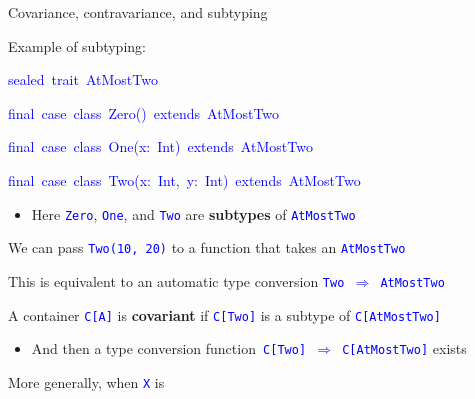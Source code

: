 \documentclass[english]{beamer}
\newenvironment{lyxcode}
   {\par\begin{list}{}{
     \setlength{\rightmargin}{\leftmargin}
     \setlength{\listparindent}{0pt}%
     \raggedright
     \setlength{\itemsep}{0pt}
     \setlength{\parsep}{0pt}
     \normalfont\ttfamily}%
    \def\{{\char`\{}
    \def\}{\char`\}}
    \def\textasciitilde{\char`\~}
    \item[]}
   {\end{list}}
\begin{document}
\begin{frame}{Covariance, contravariance, and subtyping}

\begin{itemize}
\item Example of subtyping:
\begin{lyxcode}
\textcolor{blue}{\footnotesize{}sealed~trait~AtMostTwo}{\footnotesize \par}

\textcolor{blue}{\footnotesize{}final~case~class~Zero()~extends~AtMostTwo}{\footnotesize \par}

\textcolor{blue}{\footnotesize{}final~case~class~One(x:~Int)~extends~AtMostTwo}{\footnotesize \par}

\textcolor{blue}{\footnotesize{}final~case~class~Two(x:~Int,~y:~Int)~extends~AtMostTwo}{\footnotesize \par}
\end{lyxcode}
\begin{itemize}
\item Here \texttt{\textcolor{blue}{\footnotesize{}Zero}}, \texttt{\textcolor{blue}{\footnotesize{}One}},
and \texttt{\textcolor{blue}{\footnotesize{}Two}} are \textbf{subtypes}
of \texttt{\textcolor{blue}{\footnotesize{}AtMostTwo}}{\footnotesize \par}
\end{itemize}
\item We can pass \texttt{\textcolor{blue}{\footnotesize{}Two(10, 20)}}
to a function that takes an \texttt{\textcolor{blue}{\footnotesize{}AtMostTwo}}{\footnotesize \par}
\item This is equivalent to an automatic type conversion \texttt{\textcolor{blue}{\footnotesize{}Two
$\Rightarrow$ AtMostTwo}}{\footnotesize \par}
\item A container \texttt{\textcolor{blue}{\footnotesize{}C{[}A{]}}} is
\textbf{covariant} if \texttt{\textcolor{blue}{\footnotesize{}C{[}Two{]}}}
is a subtype of \texttt{\textcolor{blue}{\footnotesize{}C{[}AtMostTwo{]}}}{\footnotesize \par}
\begin{itemize}
\item And then a type conversion function\texttt{\textcolor{blue}{\footnotesize{}
C{[}Two{]} $\Rightarrow$ C{[}AtMostTwo{]}}} exists
\end{itemize}
\item More generally, when \texttt{\textcolor{blue}{\footnotesize{}X}} is

\end{itemize}
\end{frame}
\end{document}
